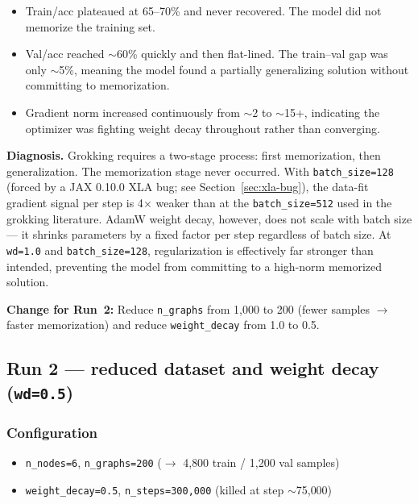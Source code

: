 \documentclass[11pt, a4paper]{article}
\begin{document}
\begin{itemize}[noitemsep]
  \item Train/acc plateaued at 65--70\% and never recovered. The model did not
        memorize the training set.
  \item Val/acc reached $\sim$60\% quickly and then flat-lined. The train--val
        gap was only $\sim$5\%, meaning the model found a partially generalizing
        solution without committing to memorization.
  \item Gradient norm increased continuously from $\sim$2 to $\sim$15+,
        indicating the optimizer was fighting weight decay throughout rather
        than converging.
\end{itemize}

\textbf{Diagnosis.} Grokking requires a two-stage process: first memorization,
then generalization. The memorization stage never occurred. With
\texttt{batch\_size=128} (forced by a JAX 0.10.0 XLA bug; see
Section~\ref{sec:xla-bug}), the data-fit gradient signal per step is 4$\times$
weaker than at the \texttt{batch\_size=512} used in the grokking literature.
AdamW weight decay, however, does not scale with batch size --- it shrinks
parameters by a fixed factor per step regardless of batch size. At
\texttt{wd=1.0} and \texttt{batch\_size=128}, regularization is effectively
far stronger than intended, preventing the model from committing to a
high-norm memorized solution.

\textbf{Change for Run~2:} Reduce \texttt{n\_graphs} from 1{,}000 to 200
(fewer samples $\to$ faster memorization) and reduce \texttt{weight\_decay}
from 1.0 to 0.5.

\subsection{Run 2 --- reduced dataset and weight decay (\texttt{wd=0.5})}

\subsubsection{Configuration}

\begin{itemize}[noitemsep]
  \item \texttt{n\_nodes=6}, \texttt{n\_graphs=200} ($\to$ 4{,}800 train / 1{,}200 val samples)
  \item \texttt{weight\_decay=0.5}, \texttt{n\_steps=300{,}000}
        (killed at step $\sim$75{,}000)
\end{itemize}
\end{document}
